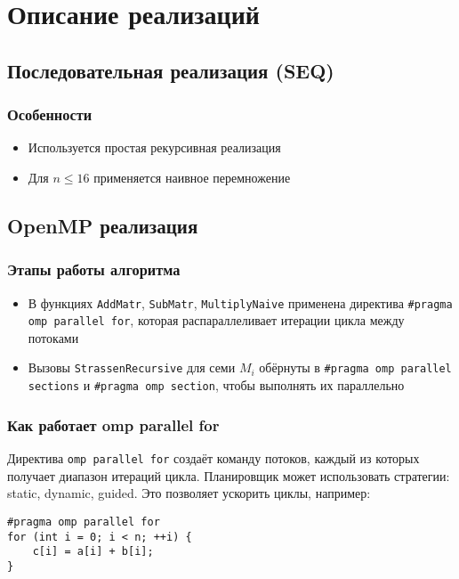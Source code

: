 \documentclass[12pt]{article}
\begin{document}
\section{Описание реализаций}

\subsection{Последовательная реализация (SEQ)}
\subsubsection*{Особенности}
\begin{itemize}
  \item Используется простая рекурсивная реализация
  \item Для $n \leq 16$ применяется наивное перемножение
\end{itemize}

\subsection{OpenMP реализация}
\subsubsection*{Этапы работы алгоритма}
\begin{itemize}
  \item В функциях \texttt{AddMatr}, \texttt{SubMatr}, \texttt{MultiplyNaive} применена директива \texttt{\#pragma omp parallel for}, которая распараллеливает итерации цикла между потоками
  \item Вызовы \texttt{StrassenRecursive} для семи $M_i$ обёрнуты в \texttt{\#pragma omp parallel sections} и \texttt{\#pragma omp section}, чтобы выполнять их параллельно
\end{itemize}

\subsubsection*{Как работает omp parallel for}
Директива \texttt{omp parallel for} создаёт команду потоков, каждый из которых получает диапазон итераций цикла. Планировщик может использовать стратегии: static, dynamic, guided. Это позволяет ускорить циклы, например:
\begin{lstlisting}
#pragma omp parallel for
for (int i = 0; i < n; ++i) {
    c[i] = a[i] + b[i];
}
\end{lstlisting}
\end{document}
